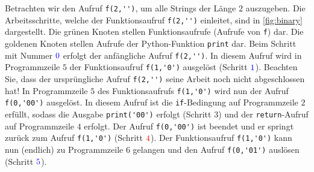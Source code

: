 \noindent
Betrachten wir den Aufruf \verb|f(2,'')|, um alle Strings der Länge $2$ auszugeben. Die Arbeitsschritte, welche der Funktionsaufruf \verb|f(2,'')| einleitet, sind in \cref{fig:binary} dargestellt. Die \textcolor{Green!55}{grünen} Knoten stellen Funktionsaufrufe (Aufrufe von \verb|f|) dar. Die \textcolor{Gold!85}{goldenen} Knoten stellen Aufrufe der Python-Funktion \verb|print| dar. Beim Schritt mit Nummer $\textcolor{Blue}{0}$ erfolgt der anfängliche Aufruf \verb|f(2,'')|. In diesem Aufruf wird in Programmzeile $5$ der Funktionsaufruf \verb|f(1,'0')| ausgelöst (Schritt $\textcolor{Blue}{1}$). Beachten Sie, dass der ursprüngliche Aufruf \verb|f(2,'')| seine Arbeit noch nicht abgeschlossen hat! In Programmzeile $5$ des Funktionsaufrufs \verb|f(1,'0')| wird nun der Aufruf \verb|f(0,'00')| ausgelöst. In diesem Aufruf ist die \verb|if|-Bedingung auf Programmzeile $2$ erfüllt, sodass die Ausgabe \verb|print('00')| erfolgt (Schritt $3$) und der \verb|return|-Aufruf auf Programmzeile $4$ erfolgt. Der Aufruf \verb|f(0,'00')| ist beendet und er springt zurück zum Aufruf \verb|f(1,'0')| (Schritt $\textcolor{Red}{4}$). Der Funktionsaufruf \verb|f(1,'0')| kann nun (endlich) zu Programmzeile $6$ gelangen und den Aufruf \verb|f(0,'01')| auslösen (Schritt $\textcolor{Blue}{5}$).

